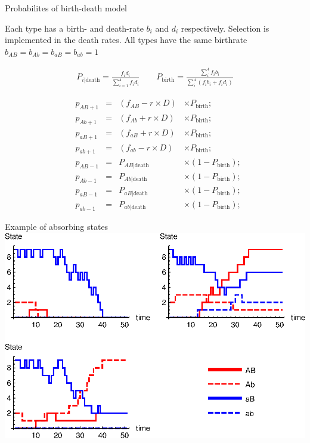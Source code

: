 \documentclass{beamer}
\begin{document}
\begin{frame}{Probabilites of birth-death model}

\footnotesize
Each type has a birth- and death-rate $b_i$ and $d_i$ respectively. Selection is implemented in the death rates. All types have the same birthrate $b_{AB}=b_{Ab}=b_{aB}=b_{ab} =1$  

    \begin{equation*}
    \begin{aligned}
        P_{i|\text{death}}=\frac{f_id_i}{\sum_{i=1}^4 f_id_i} \qquad P_\text{birth} = \frac{\sum_i^4 f_i b_i}{\sum_i^4 (f_i b_i + f_i d_i)} 
    \end{aligned}
    \end{equation*}
    
    \begin{equation*}
    \begin{aligned}
        &p_{AB+1} & =& (f_{AB}-r\times D) & \times P_\text{birth};\\
        &p_{Ab+1} & =& (f_{Ab}+r\times D) & \times P_\text{birth};\\
        &p_{aB+1} & =& (f_{aB}+r\times D) & \times P_\text{birth};\\
        &p_{ab+1} & =& (f_{ab}-r\times D) & \times P_\text{birth};\\
        &p_{AB-1} & =& P_{AB|\text{death}} & \times (1-P_\text{birth}); \\
        &p_{Ab-1} & =& P_{Ab|\text{death}} & \times (1-P_\text{birth}); \\
        &p_{aB-1} & =& P_{aB|\text{death}} & \times (1-P_\text{birth}); \\
        &p_{ab-1} & =& P_{ab|\text{death}} & \times (1-P_\text{birth}); 
    \end{aligned}
    \end{equation*} 

    
 \normalsize
    
\end{frame}

\begin{frame}{Example of absorbing states}
    \includegraphics[width=1.0\textwidth]{Matlab/Figures/gridplot.eps}
\end{frame}
\end{document}

